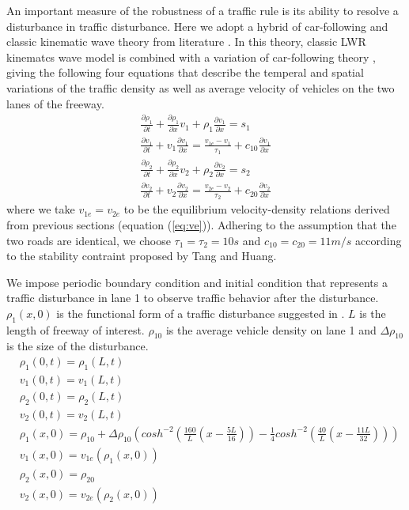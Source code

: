 An important measure of the robustness of a traffic rule is its ability to resolve a disturbance in traffic disturbance. Here we adopt a hybrid of car-following and classic kinematic wave theory from literature \cite{tang_2004}.  In this theory, classic LWR kinematcs wave model \cite{lighthill_1955,richards_1955} is combined with a variation of car-following theory \cite{jiang_2002}, giving the following four equations that describe the temperal and spatial variations of the traffic density as well as average velocity of vehicles on the two lanes of the freeway.
	\begin{align} \label{eq:pde}
	& \frac{\partial \rho_1}{\partial t} + \frac{\partial \rho_1}{\partial x}v_1+\rho_1\frac{\partial v_1}{\partial x}=s_1 & \\
	& \frac{\partial v_1}{\partial t} + v_1\frac{\partial v_1}{\partial x} = \frac{v_{1e}-v_1}{\tau_1}+c_{10}\frac{\partial v_1}{\partial x} & \\
	& \frac{\partial \rho_2}{\partial t} + \frac{\partial \rho_2}{\partial x}v_2+\rho_2\frac{\partial v_2}{\partial x}=s_2 & \\
	& \frac{\partial v_2}{\partial t} + v_2\frac{\partial v_2}{\partial x} = \frac{v_{2e}-v_2}{\tau_2}+c_{20}\frac{\partial v_2}{\partial x} &
	\end{align}
	where we take $v_{1e} = v_{2e}$ to be the equilibrium velocity-density relations derived from previous sections (equation (\ref{eq:ve})). Adhering to the assumption that the two roads are identical, we choose $\tau_1=\tau_2=10s$ and $c_{10}=c_{20}=11m/s$ according to the stability contraint proposed by Tang and Huang\citep{tang_2004}.
	
	We impose periodic boundary condition and initial condition that represents a traffic disturbance in lane 1 to observe traffic behavior after the disturbance. $\rho_1(x,0)$ is the functional form of a traffic disturbance suggested in \citep{tang_2004}. $L$ is the length of freeway of interest. $\rho_{10}$ is the average vehicle density on lane 1 and $\Delta \rho_{10}$ is the size of the disturbance. 
	\begin{align}
	& \rho_1(0,t) = \rho_1(L,t) & \\
	& v_1(0,t) = v_1(L,t) & \\
	& \rho_2(0,t) = \rho_2(L,t) & \\
	& v_2(0,t) = v_2(L,t) & \\
	&\rho_1(x,0)=\rho_{10}+\Delta \rho_{10}\left(  cosh^{-2}(\frac{160}{L}(x-\frac{5L}{16}))-\frac{1}{4}cosh^{-2}(\frac{40}{L}(x-\frac{11L}{32})) \right)& \\
	& v_1(x,0) = v_{1e}(\rho_1(x,0)) & \\
	&\rho_2(x,0)= \rho_{20}& \\ \label{eq:ic}
	& v_2(x,0) = v_{2e}(\rho_2(x,0)) & \\
	\end{align}
	
